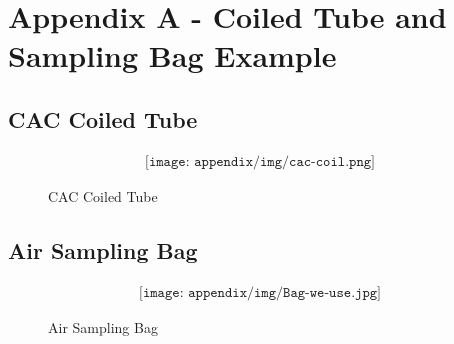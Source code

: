 
\section{Appendix A - Coiled Tube and Sampling Bag Example} \label{sec:appA}
\subsection{CAC Coiled Tube} \label{A}
\begin{figure}[H]
    \begin{align*}
        \texttt{[image: appendix/img/cac-coil.png]}
    \end{align*}
    \caption{CAC Coiled Tube}
    \label{fig:A1}
\end{figure}

\subsection{Air Sampling Bag} \label{B}
\begin{figure}[H]
    \begin{align*}
        \texttt{[image: appendix/img/Bag-we-use.jpg]}
    \end{align*}
    \caption{Air Sampling Bag}
    \label{fig:A2}
\end{figure}